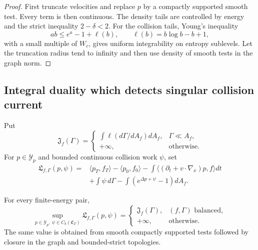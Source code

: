 \begin{proof}
First truncate velocities and replace \(p\) by a compactly supported smooth
test.  Every term is then continuous.  The density tails are controlled by
energy and the strict inequality \(2-\delta<2\).  For the collision tails,
Young's inequality
\[
 ab\le e^a-1+\ell(b),\qquad \ell(b)=b\log b-b+1,
\]
with a small multiple of \(W_c\), gives uniform integrability on entropy
sublevels.  Let the truncation radius tend to infinity and then use density of
smooth tests in the graph norm.
\end{proof}

\subsection{Integral duality which detects singular collision current}

Put
\[
 \mathfrak J_f(\Gamma)=
 \begin{cases}
 \displaystyle\int\ell(d\Gamma/dA_f)dA_f,&\Gamma\ll A_f,\\
 +\infty,&\text{otherwise}.
 \end{cases}
\]
For \(p\in\mathcal Y_p\) and bounded continuous collision work \(\psi\), set
\[
 \begin{aligned}
 \mathfrak L_{f,\Gamma}(p,\psi)
 ={}&\langle p_T,f_T\rangle-\langle p_0,f_0\rangle
 -\int\langle(\partial_t+v\cdot\nabla_x)p,f\rangle dt\\
 &+\int\psi\,d\Gamma
 -\int(e^{\Delta p+\psi}-1)dA_f.
 \end{aligned}
\]

\begin{theorem}
\label{thm:r3-b3-duality}
For every finite-energy pair,
\[
 \sup_{p\in\mathcal Y_p,\ \psi\in C_b(\mathfrak C_T)}
 \mathfrak L_{f,\Gamma}(p,\psi)
 =\begin{cases}
 \mathfrak J_f(\Gamma),&(f,\Gamma)\text{ balanced},\\
 +\infty,&\text{otherwise}.
 \end{cases}
\]
The same value is obtained from smooth compactly supported tests followed by
closure in the graph and bounded-strict topologies.
\end{theorem}

